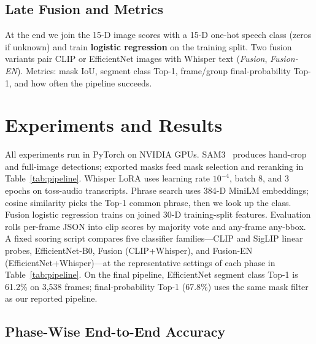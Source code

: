 \documentclass[conference]{IEEEtran}
\begin{document}
\subsection{Late Fusion and Metrics}
At the end we join the 15-D image scores with a 15-D one-hot speech class (zeros if unknown) and train \textbf{logistic regression} on the training split.
Two fusion variants pair CLIP or EfficientNet images with Whisper text (\emph{Fusion}, \emph{Fusion-EN}).
Metrics: mask IoU, segment class Top-1, frame/group final-probability Top-1, and how often the pipeline succeeds.

\section{Experiments and Results}
\label{sec:experiments}

All experiments run in PyTorch on NVIDIA GPUs. SAM3~\cite{carion2025sam3} produces hand-crop and full-image detections; exported masks feed mask selection and reranking in Table~\ref{tab:pipeline}.
Whisper LoRA uses learning rate $10^{-4}$, batch 8, and 3 epochs on toss-audio transcripts. Phrase search uses 384-D MiniLM embeddings; cosine similarity picks the Top-1 common phrase, then we look up the class.
Fusion logistic regression trains on joined 30-D training-split features. Evaluation rolls per-frame JSON into clip scores by majority vote and any-frame any-bbox.
A fixed scoring script compares five classifier families---CLIP and SigLIP linear probes, EfficientNet-B0, Fusion (CLIP+Whisper), and Fusion-EN (EfficientNet+Whisper)---at the representative settings of each phase in Table~\ref{tab:pipeline}.
On the final pipeline, EfficientNet segment class Top-1 is 61.2\% on 3{,}538 frames; final-probability Top-1 (67.8\%) uses the same mask filter as our reported pipeline.

\subsection{Phase-Wise End-to-End Accuracy}
\end{document}
